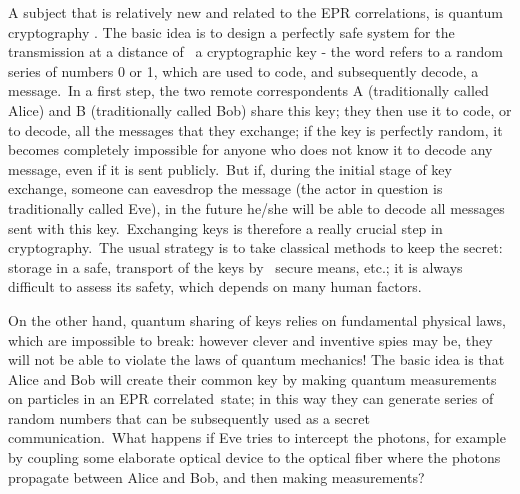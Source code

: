 \documentclass[12pt,onecolumn]{article}%
\begin{document}
A subject that is relatively new and related to the EPR correlations, is
quantum cryptography \cite{Ekert} \cite{Bennett2}. The basic idea is to design
a perfectly safe system for the transmission at a distance of \ a
cryptographic key - the word refers to a random series of numbers 0 or 1,
which are used to code, and subsequently decode, a message.\ In a first step,
the two remote correspondents A (traditionally called Alice) and B
(traditionally called Bob) share this key; they then use it to code, or to
decode, all the messages that they exchange; if the key is perfectly random,
it becomes completely impossible for anyone who does not know it to decode any
message, even if it is sent publicly.\ But if, during the initial stage of key
exchange, someone can eavesdrop the message (the actor in question is
traditionally called Eve), in the future he/she will be able to decode all
messages sent with this key.\ Exchanging keys is therefore a really crucial
step in cryptography.\ The usual strategy is to take classical methods to keep
the secret: storage in a safe, transport of the keys by \ secure means, etc.;
it is always difficult to assess its safety, which depends on many human factors.

On the other hand, quantum sharing of keys relies on fundamental physical
laws, which are impossible to break: however clever and inventive spies may
be, they will not be able to violate the laws of quantum mechanics! The basic
idea is that Alice and Bob will create their common key by making quantum
measurements on particles in an EPR correlated\ state; in this way they can
generate series of random numbers that can be subsequently used as a secret
communication.\ What happens if Eve tries to intercept the photons, for
example by coupling some elaborate optical device to the optical fiber where
the photons propagate between Alice and Bob, and then making measurements?
\end{document}
